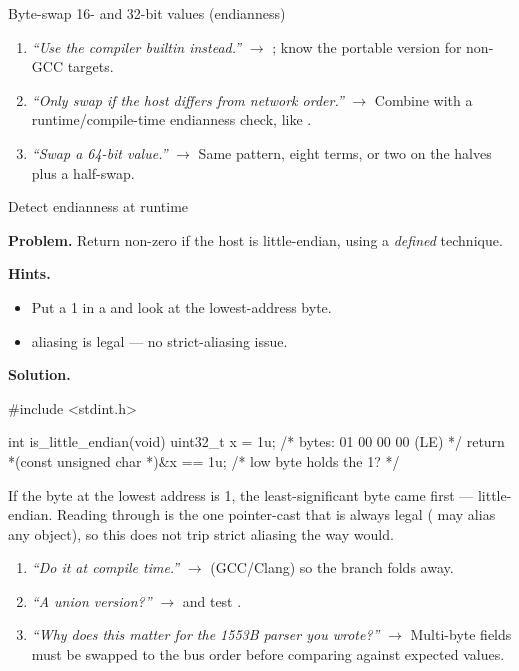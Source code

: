\begin{gymproblem}{Byte-swap 16- and 32-bit values (endianness)}
\followups
\begin{enumerate}
\item \emph{``Use the compiler builtin instead.''} $\rightarrow$
  ; know the portable version for non-GCC targets.
\item \emph{``Only swap if the host differs from network order.''}
  $\rightarrow$ Combine with a runtime/compile-time endianness check, like
  .
\item \emph{``Swap a 64-bit value.''} $\rightarrow$ Same pattern, eight terms,
  or two  on the halves plus a half-swap.
\end{enumerate}
\end{gymproblem}

\begin{gymproblem}{Detect endianness at runtime}

\textbf{Problem.} Return non-zero if the host is little-endian, using a
\emph{defined} technique.

\textbf{Hints.}
\begin{itemize}
\item Put a 1 in a  and look at the lowest-address byte.
\item {} aliasing is legal --- no strict-aliasing issue.
\end{itemize}

\attempt

\textbf{Solution.}
\begin{cgym}
#include <stdint.h>

int is_little_endian(void) {
    uint32_t x = 1u;                          /* bytes: 01 00 00 00 (LE) */
    return *(const unsigned char *)&x == 1u;  /* low byte holds the 1?  */
}
\end{cgym}

If the byte at the lowest address is 1, the least-significant byte came first
--- little-endian. Reading through  is the one
pointer-cast that is always legal ( may alias any object),
so this does not trip strict aliasing the way  would.

\followups
\begin{enumerate}
\item \emph{``Do it at compile time.''} $\rightarrow$
   (GCC/Clang) so
  the branch folds away.
\item \emph{``A union version?''} $\rightarrow$
   and test .
\item \emph{``Why does this matter for the 1553B parser you wrote?''}
  $\rightarrow$ Multi-byte fields must be swapped to the bus order before
  comparing against expected values.
\end{enumerate}
\end{gymproblem}

